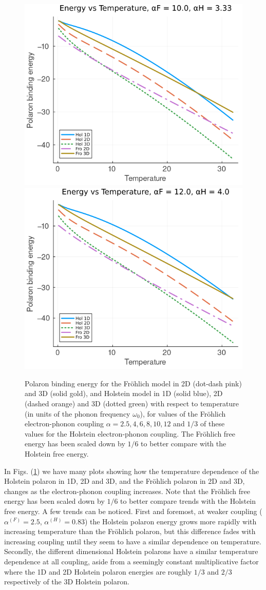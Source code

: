 \begin{figure}[!tbp]
    \includegraphics[width=.49\textwidth]{figures/energy_temp_10_333.png}
    \includegraphics[width=.49\textwidth]{figures/energy_temp_12_4.png}
    \caption{Polaron binding energy for the Fr\"ohlich model in 2D (dot-dash pink) and 3D (solid gold), and Holstein model in 1D (solid blue), 2D (dashed orange) and 3D (dotted green) with respect to temperature (in units of the phonon frequency $\omega_0$), for values of the Fr\"ohlich electron-phonon coupling $\alpha = 2.5, 4, 6, 8, 10, 12$ and $1/3$ of these values for the Holstein electron-phonon coupling. The Fr\"ohlich free energy has been scaled down by $1/6$ to better compare with the Holstein free energy.}
    \label{fig:energy_temp}
\end{figure}

In Figs. (\ref{fig:energy_temp}) we have many plots showing how the temperature dependence of the Holstein polaron in 1D, 2D and 3D, and the Fr\"ohlich polaron in 2D and 3D, changes as the electron-phonon coupling increases. Note that the Fr\"ohlich free energy has been scaled down by $1/6$ to better compare trends with the Holstein free energy. A few trends can be noticed. First and foremost, at weaker coupling ($\alpha^{(F)} = 2.5$, $\alpha^{(H)} = 0.83$) the Holstein polaron energy grows more rapidly with increasing temperature than the Fr\"ohlich polaron, but this difference fades with increasing coupling until they seem to have a similar dependence on temperature. Secondly, the different dimensional Holstein polarons have a similar temperature dependence at all coupling, aside from a seemingly constant multiplicative factor where the 1D and 2D Holstein polaron energies are roughly $1/3$ and $2/3$ respectively of the 3D Holstein polaron. 

